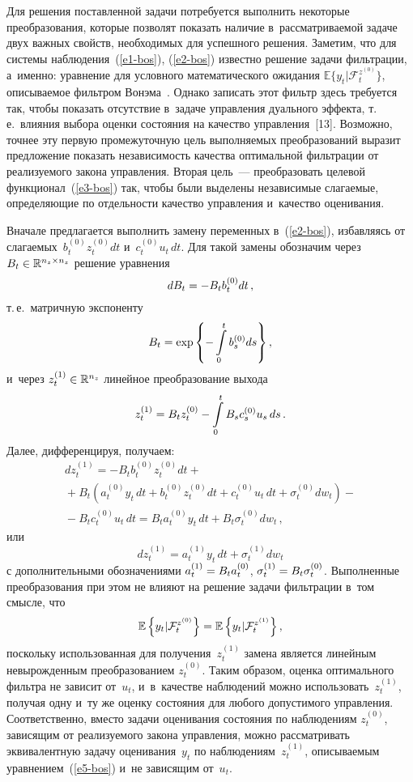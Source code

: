 \begin{multicols}{2}
     Для решения поставленной задачи потребуется выполнить некоторые 
преобразования, которые позволят показать наличие в~рассматриваемой 
задаче двух важных свойств, необходимых для успешного решения. Заметим, 
что для системы наблюдения~(\ref{e1-bos}), (\ref{e2-bos}) известно решение 
задачи фильтрации, а~именно: уравнение для условного математического 
ожидания $\mathbb{E}\{y_t\vert \mathcal{F}_t^{z^{(0)}}\}$, описываемое 
фильтром Вонэма~\cite{11-bos}. Однако записать этот фильтр здесь 
требуется так, чтобы показать отсутствие в~задаче управления дуального 
эффекта, т.\,е.\ влияния выбора оценки состояния на качество 
управления~[13]. Возможно, точнее эту первую промежуточную цель 
выполняемых преобразований выразит предложение показать независимость 
качества оптимальной фильтрации от реализуемого закона управления. 
Вторая цель~--- преобразовать целевой  
функционал~(\ref{e3-bos}) так, чтобы были выделены независимые 
слагаемые, определяющие по отдельности качество управления и~качество 
оценивания.
     
     Вначале предлагается выполнить замену переменных в~(\ref{e2-bos}), 
избавляясь от слагаемых~$b_t^{(0)} z_t^{(0)}dt$ и~$c_t^{(0)} u_t \,dt$. Для 
такой замены обозначим через $B_t\hm\in \mathbb{R}^{n_z\times n_z}$ 
решение уравнения 
$$
dB_t\hm= -B_t b_t^{(0)} dt\,,
$$
 т.\,е.\ матричную экспоненту 
$$
B_t\hm= \exp \left\{ -\int\limits_0^t b_s^{(0)}ds\right\},
$$ 
и~через $z_t^{(1)}\hm\in 
\mathbb{R}^{n_z}$ линейное преобразование выхода 
$$
z_t^{(1)}\hm= B_t 
z_t^{(0)} \hm- \int\limits_0^t B_s c_s^{(0)} u_s\, ds\,.
$$
 Далее, дифференцируя,  
получаем: 
     \begin{multline*}
     dz_t^{(1)} = -B_t b_t^{(0)} z_t^{(0)} dt +{}\\
     {}+ B_t \left( a_t^{(0)} y_t \,dt +b_t^{(0)} z_t^{(0)}dt +c_t^{(0)} u_t\,dt 
+\sigma_t^{(0)}dw_t\right)-{}\\
     {}- B_t c_t^{(0)} u_t \,dt = B_t a_t^{(0)} y_t \,dt +B_t \sigma_t^{(0)} dw_t\,,
     \end{multline*}
      или 
     \begin{equation}
     dz_t^{(1)} =a_t^{(1)}y_t \,dt +\sigma_t^{(1)}dw_t
     \label{e5-bos}
     \end{equation}
с дополнительными обозначениями $a_t^{(1)} \hm= B_t a_t^{(0)}$, 
$\sigma_t^{(1)}\hm= B_t \sigma_t^{(0)}$. Выполненные преобразования при 
этом не влияют на решение задачи фильтрации в~том смысле, что 
$$
\mathbb{E}\left\{ y_t\vert \mathcal{F}_t^{z^{(0)}}\right\} \hm= \mathbb{E}\left \{ y_t\vert 
\mathcal{F}_t^{z^{(1)}}\right\},
$$
 поскольку использованная для получения~$z_t^{(1)}$ 
замена является линейным невырожденным преобразованием $z_t^{(0)}$. 
Таким образом, оценка оптимального фильтра не зависит от~$u_t$, 
и~в~качестве наблюдений можно использовать~$z_t^{(1)}$, получая одну 
и~ту же оценку состояния для любого допустимого управ\-ле\-ния. 
Соответственно, вместо задачи оценивания состояния по наблюдениям 
$z_t^{(0)}$, зависящим от реализуемого закона управ\-ле\-ния, можно 
рас\-смат\-ри\-вать эквивалентную задачу оценивания~$y_t$ по 
наблюдениям~$z_t^{(1)}$, опи\-сы\-ва\-емым урав\-не\-ни\-ем~(\ref{e5-bos}) и~не 
зависящим от~$u_t$.


\end{multicols}
